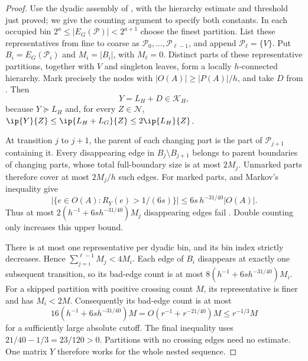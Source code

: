 \begin{proof}
Use the dyadic assembly of \cite[Lemma 4.2]{ThinTreesCompanion}, with
the hierarchy estimate and threshold just proved; we give the
counting argument to specify both constants.  In each occupied bin
$2^a\le |E_G(\mathcal P)|<2^{a+1}$ choose the finest partition.
List these representatives from fine to coarse as
$\mathcal P_0,\ldots,\mathcal P_{\ell-1}$, and append
$\mathcal P_\ell=\{V\}$.  Put
$B_i=E_G(\mathcal P_i)$ and $M_i=|B_i|$, with $M_\ell=0$.
Distinct parts of these representative partitions, together with $V$ and singleton leaves,
form a locally $h$-connected hierarchy.  Mark precisely the nodes
with $|O(A)|\ge|P(A)|/h$, and take $D$ from
.  Then
\[
 Y=L_H+D\in\mathcal K_H,
\]
because $Y\succeq L_H$ and, for every $Z\in\mathcal N$,
$\ip{Y}{Z}\le\ip{L_H+L_G}{Z}\le2\ip{L_H}{Z}$.

At transition $j$ to $j+1$, the parent of each changing part is
the part of $\mathcal P_{j+1}$ containing it.  Every disappearing
edge in $B_j\setminus B_{j+1}$ belongs to parent boundaries of
changing parts, whose total full-boundary size is at most $2M_j$.
Unmarked parts therefore cover at most $2M_j/h$ such edges.
For marked parts,  and Markov's
inequality give
\[
 |\{e\in O(A):R_Y(e)>1/(6s)\}|
 \le6s\,h^{-31/40}|O(A)|.
\]
Thus at most $2(h^{-1}+6s h^{-31/40})M_j$ disappearing edges
fail .  Double counting only increases
this upper bound.

There is at most one representative per dyadic bin, and its bin
index strictly decreases.  Hence
$\sum_{j=i}^{\ell-1}M_j<4M_i$.  Each edge of $B_i$ disappears
at exactly one subsequent transition, so its bad-edge count is
at most $8(h^{-1}+6s h^{-31/40})M_i$.
For a skipped partition with positive crossing count $M$, its
representative is finer and has $M_i<2M$.  Consequently its
bad-edge count is at most
\begin{equation}\label{tg:response-fraction}
 16(h^{-1}+6s h^{-31/40})M
 =O(r^{-1}+r^{-21/40})M\le r^{-1/3}M
\end{equation}
for a sufficiently large absolute cutoff.  The final inequality
uses $21/40-1/3=23/120>0$.  Partitions with no crossing edges
need no estimate.  One matrix $Y$ therefore works for the whole
nested sequence.
\end{proof}
